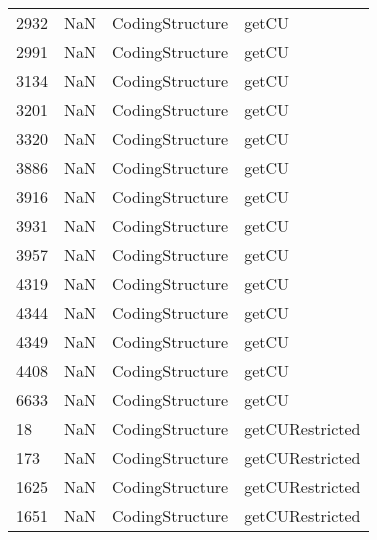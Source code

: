 \begin{tabular}{llll}
2932 &                   NaN &            CodingStructure &                                     getCU \\
2991 &                   NaN &            CodingStructure &                                     getCU \\
3134 &                   NaN &            CodingStructure &                                     getCU \\
3201 &                   NaN &            CodingStructure &                                     getCU \\
3320 &                   NaN &            CodingStructure &                                     getCU \\
3886 &                   NaN &            CodingStructure &                                     getCU \\
3916 &                   NaN &            CodingStructure &                                     getCU \\
3931 &                   NaN &            CodingStructure &                                     getCU \\
3957 &                   NaN &            CodingStructure &                                     getCU \\
4319 &                   NaN &            CodingStructure &                                     getCU \\
4344 &                   NaN &            CodingStructure &                                     getCU \\
4349 &                   NaN &            CodingStructure &                                     getCU \\
4408 &                   NaN &            CodingStructure &                                     getCU \\
6633 &                   NaN &            CodingStructure &                                     getCU \\
18   &                   NaN &            CodingStructure &                           getCURestricted \\
173  &                   NaN &            CodingStructure &                           getCURestricted \\
1625 &                   NaN &            CodingStructure &                           getCURestricted \\
1651 &                   NaN &            CodingStructure &                           getCURestricted \\

\end{tabular}

